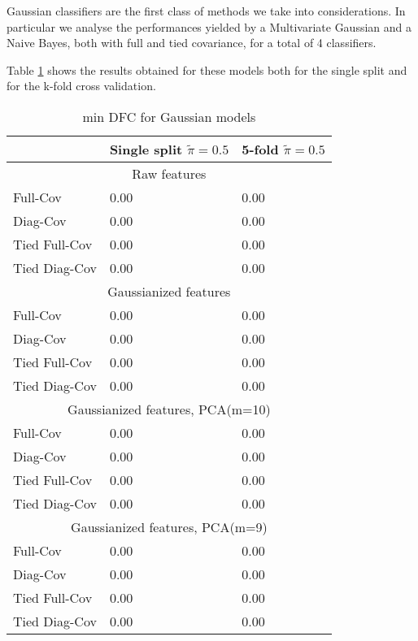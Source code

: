 Gaussian classifiers are the first class of methods we take into considerations. In particular we analyse the performances yielded by a Multivariate Gaussian and a Naive Bayes, both with full and tied covariance, for a total of 4 classifiers.
 
Table \ref{tab:gaus_res} shows the results obtained for these models both for the single split and for the k-fold cross validation.

\noindent
\begin{table}[H]
\begin{tabular}{ p{2.5cm} p{2cm} p{1.5cm}  }
	\hline
	& \makecell{\textbf{Single split} \\ $\tilde{\pi} = 0.5$} & \makecell{\textbf{5-fold} \\ $\tilde{\pi} = 0.5$} \\
	\hline
	\multicolumn{3}{c}{Raw features} \\
	\hline
	Full-Cov & 0.00 &  0.00 \\
	Diag-Cov & 0.00 & 0.00 \\
	Tied Full-Cov & 0.00 & 0.00 \\
	Tied Diag-Cov &  0.00 & 0.00 \\	
	\hline
	\multicolumn{3}{c}{Gaussianized features} \\
	\hline
	Full-Cov & 0.00 &  0.00 \\
	Diag-Cov & 0.00 & 0.00 \\
	Tied Full-Cov & 0.00 & 0.00 \\
	Tied Diag-Cov &  0.00 & 0.00 \\	
	\hline
	\multicolumn{3}{c}{Gaussianized features, PCA(m=10)} \\
	\hline
	Full-Cov & 0.00 &  0.00 \\
	Diag-Cov & 0.00 & 0.00 \\
	Tied Full-Cov & 0.00 & 0.00 \\
	Tied Diag-Cov &  0.00 & 0.00 \\	
	\hline
	\multicolumn{3}{c}{Gaussianized features, PCA(m=9)} \\
	\hline
	Full-Cov & 0.00 &  0.00 \\
	Diag-Cov & 0.00 & 0.00 \\
	Tied Full-Cov & 0.00 & 0.00 \\
	Tied Diag-Cov &  0.00 & 0.00 \\	
	\hline
\end{tabular}
\caption{min DFC for Gaussian models}
\label{tab:gaus_res}
\end{table}


